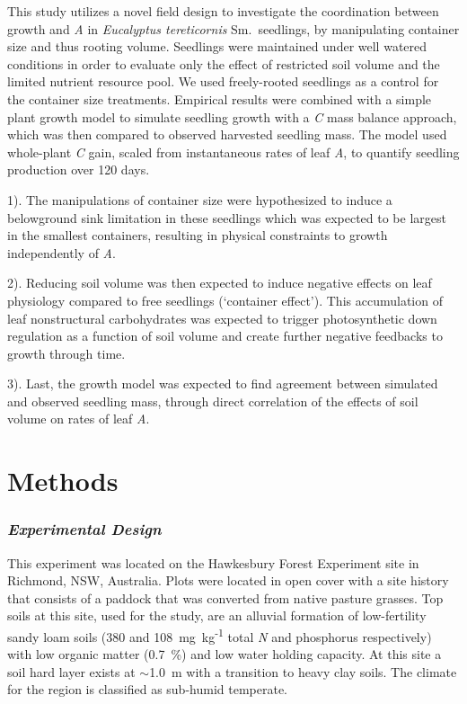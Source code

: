 \documentclass[a4paper]{article}\usepackage[]{graphicx}\usepackage[]{color}
\begin{document}
This study utilizes a novel field design to investigate the coordination between growth and \textit{A} in \textit{Eucalyptus tereticornis} Sm.~seedlings, by manipulating container size and thus rooting volume. Seedlings were maintained under well watered conditions in order to evaluate only the effect of restricted soil volume and the limited nutrient resource pool. We used freely-rooted seedlings as a control for the container size treatments.  Empirical results were combined with a simple plant growth model to simulate seedling growth with a \textit{C} mass balance approach, which was then compared to observed harvested seedling mass.  The model used whole-plant \textit{C} gain, scaled from instantaneous rates of leaf \textit{A}, to quantify seedling production over 120 days. 

1). The manipulations of container size were hypothesized to induce a belowground sink limitation in these seedlings which was expected to be largest in the smallest containers, resulting in physical constraints to growth independently of \textit{A}.

2). Reducing soil volume was then expected to induce negative effects on leaf physiology compared to free seedlings (‘container effect’). This accumulation of leaf nonstructural carbohydrates was expected to trigger photosynthetic down regulation as a function of soil volume and create further negative feedbacks to growth through time.

3). Last, the growth model was expected to find agreement between simulated and observed seedling mass, through direct correlation of the effects of soil volume on rates of leaf \textit{A}.

\section*{Methods}

\subsubsection*{\textit{Experimental Design}}

This experiment was located on the Hawkesbury Forest Experiment site in Richmond, NSW, Australia. Plots were located in open cover with a site history that consists of a paddock that was converted from native pasture grasses. Top soils at this site, used for the study, are an alluvial formation of low-fertility sandy loam soils (380 and 108~mg~kg\textsuperscript{-1} total \textit{N} and phosphorus respectively) with low organic matter (0.7~\%) and low water holding capacity. At this site a soil hard layer exists at $\sim$1.0~m with a transition to heavy clay soils. The climate for the region is classified as sub-humid temperate. 
\end{document}
